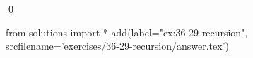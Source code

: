 
\begin{ex}
  \label{ex:36-29-recursion}
  
  \qed
\end{ex}
\begin{python0}
from solutions import *
add(label="ex:36-29-recursion",
    srcfilename='exercises/36-29-recursion/answer.tex')
\end{python0}
